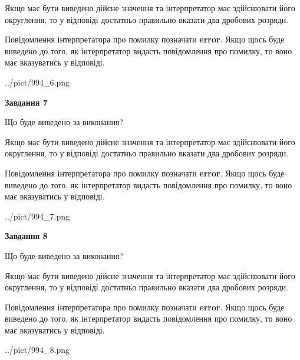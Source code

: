 \documentclass[12pt, ukrainian]{article}
\begin{document}
{\begin {Large}
Якщо має бути виведено дійсне значення та інтерпретатор має здійснювати його округлення, 
то у відповіді достатньо правильно вказати два дробових розряди.

Повідомлення інтерпретатора про помилку позначати \textbf{error}.
Якщо щось буде виведено до того, як інтерпретатор видасть повідомлення про помилку, 
то воно має вказуватись у відповіді. \par

\begin{center}
	{../pict/994_6.png}
\end{center}
\newpage

{\begin {center}\textbf{Завдання 7}\end {center}}\par
Що буде виведено за виконання? \par

Якщо має бути виведено дійсне значення та інтерпретатор має здійснювати його округлення, 
то у відповіді достатньо правильно вказати два дробових розряди.

Повідомлення інтерпретатора про помилку позначати \textbf{error}.
Якщо щось буде виведено до того, як інтерпретатор видасть повідомлення про помилку, 
то воно має вказуватись у відповіді. \par

\begin{center}
	{../pict/994_7.png}
\end{center}
\newpage

{\begin {center}\textbf{Завдання 8}\end {center}}\par
Що буде виведено за виконання? \par

Якщо має бути виведено дійсне значення та інтерпретатор має здійснювати його округлення, 
то у відповіді достатньо правильно вказати два дробових розряди.

Повідомлення інтерпретатора про помилку позначати \textbf{error}.
Якщо щось буде виведено до того, як інтерпретатор видасть повідомлення про помилку, 
то воно має вказуватись у відповіді. \par

\begin{center}
	{../pict/994_8.png}
\end{center}
\newpage


\end{Large}}
\end{document}
